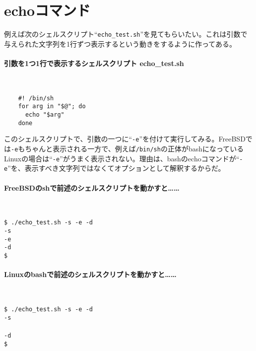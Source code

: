 \section{echoコマンド}

例えば次のシェルスクリプト``\verb|echo_test.sh|''を見てもらいたい。これは引数で与えられた文字列を1行ずつ表示するという動きをするように作ってある。

\paragraph{引数を1つ1行で表示するシェルスクリプト echo\_{}test.sh} 　\\
\begin{frameboxit}{160.0mm}
\begin{verbatim}
	#! /bin/sh
	for arg in "$@"; do
	  echo "$arg"
	done
\end{verbatim}
\end{frameboxit}

このシェルスクリプトで、引数の一つに``\verb|-e|''を付けて実行してみる。FreeBSDでは\verb|-e|もちゃんと表示される一方で、例えば\verb|/bin/sh|の正体がbashになっているLinuxの場合は``\verb|-e|''がうまく表示されない。理由は、bashのechoコマンドが``\verb|-e|''を、表示すべき文字列ではなくてオプションとして解釈するからだ。

\paragraph{FreeBSDのshで前述のシェルスクリプトを動かすと……} 　\\
\begin{screen}
	\verb|$ ./echo_test.sh -s -e -d| \return \\
	\verb|-s| \\
	\verb|-e| \\
	\verb|-d| \\
	\verb|$ |
\end{screen}

\paragraph{Linuxのbashで前述のシェルスクリプトを動かすと……} 　\\
\begin{screen}
	\verb|$ ./echo_test.sh -s -e -d| \return \\
	\verb|-s| \\
	\verb|| \\
	\verb|-d| \\
	\verb|$ |
\end{screen}

